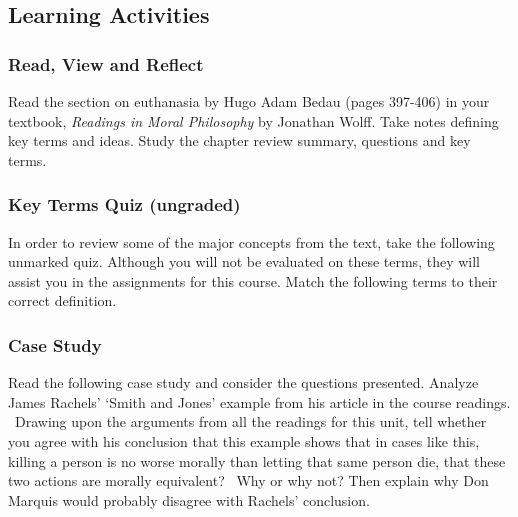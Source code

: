 \documentclass[
]{book}
\begin{document}
\hypertarget{learning-activities-20}{%
\subsection*{Learning Activities}\label{learning-activities-20}}

\begin{reflect}
\hypertarget{read-view-and-reflect-27}{%
\subsubsection*{Read, View and Reflect}\label{read-view-and-reflect-27}}

Read the section on euthanasia by Hugo Adam Bedau (pages 397-406) in your
textbook, \emph{Readings in Moral Philosophy} by Jonathan Wolff. Take notes defining
key terms and ideas. Study the chapter review summary, questions and key terms.

\hypertarget{key-terms-quiz-ungraded-6}{%
\subsubsection*{Key Terms Quiz (ungraded)}\label{key-terms-quiz-ungraded-6}}

In order to review some of the major concepts from the text, take the following unmarked quiz. Although you will not be evaluated on these terms, they will assist you in the assignments for this course.
Match the following terms to their correct definition.

\hypertarget{case-study-1}{%
\subsubsection*{Case Study}\label{case-study-1}}

Read the following case study and consider the questions presented.
Analyze James Rachels' `Smith and Jones' example from his article in the course readings. ~Drawing upon the arguments from all the readings for this unit, tell whether you agree with his conclusion that this example shows that in cases like this, killing a person is no worse morally than letting that same person die, that these two actions are morally equivalent? ~Why or why not? Then explain why Don Marquis would probably disagree with Rachels' conclusion.
\end{reflect}
\end{document}
